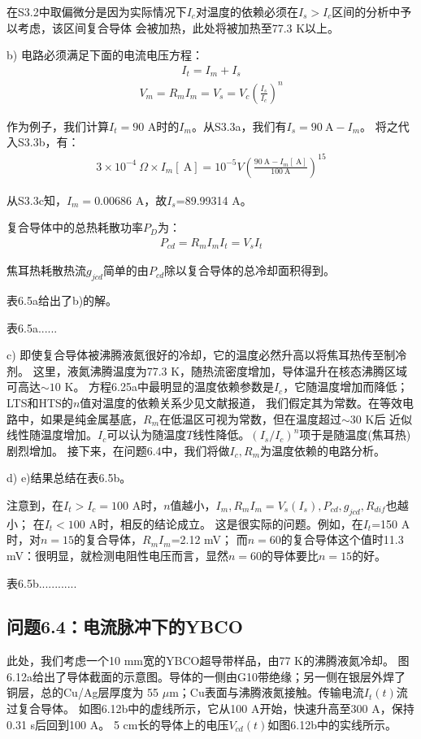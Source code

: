 在S3.2中取偏微分是因为实际情况下$I_c$对温度的依赖必须在$I_s>I_c$区间的分析中予以考虑，该区间复合导体
会被加热，此处将被加热至77.3 K以上。

b) 电路必须满足下面的电流电压方程：
\begin{align*}%
I_t=I_m+I_s \tag{S3.3a}
\end{align*}
\begin{align*}%
V_m=R_mI_m=V_s=V_c(\frac{I_s}{I_c})^{n} \tag{S3.3b}
\end{align*}

作为例子，我们计算$I_t=90$ A时的$I_m$。从S3.3a，我们有$I_s=90\ \mathrm{A}-I_m$。
将之代入S3.3b，有：
\begin{align*}%
3\times 10^{-4}\ \Omega\times I_m[\ \mathrm{A}]=10^{-5}V(\frac{90\ \mathrm{A}-I_m[\ \mathrm{A}]}{100\ \mathrm{A}})^{15} \tag{S3.3c}
\end{align*}

从S3.3c知，$I_m=$0.00686 A，故$I_s$=89.99314 A。

复合导体中的总热耗散功率$P_D$为：
\begin{align*}%
P_{cd}=R_mI_mI_t=V_sI_t \tag{S3.4}
\end{align*}

焦耳热耗散热流$g_{jcd}$简单的由$P_{cd}$除以复合导体的总冷却面积得到。

表6.5a给出了b)的解。

表6.5a......

c) 即使复合导体被沸腾液氮很好的冷却，它的温度必然升高以将焦耳热传至制冷剂。
这里，液氮沸腾温度为77.3 K，随热流密度增加，导体温升在核态沸腾区域可高达$\sim 10$ K。
方程6.25a中最明显的温度依赖参数是$I_c$，它随温度增加而降低；LTS和HTS的$n$值对温度的依赖关系少见文献报道，
我们假定其为常数。在等效电路中，如果是纯金属基底，$R_m$在低温区可视为常数，但在温度超过$\sim 30$ K后
近似线性随温度增加。$I_c$可以认为随温度$T$线性降低。$(I_s/I_c)^n$项于是随温度(焦耳热)剧烈增加。
接下来，在问题6.4中，我们将做$I_c,R_m$为温度依赖的电路分析。

d) e)结果总结在表6.5b。

注意到，在$I_t>I_c=100$ A时，$n$值越小，$I_m, R_m I_m=V_s(I_s),P_{cd},g_{jcd},R_{dif}$也越小；
在$I_t<100$ A时，相反的结论成立。
这是很实际的问题。例如，在$I_t$=150 A时，对$n=15$的复合导体，$R_mI_m$=2.12 mV；
而$n=60$的复合导体这个值时11.3 mV：很明显，就检测电阻性电压而言，显然$n=60$的导体要比$n=15$的好。 

表6.5b............


\subsection{问题6.4：电流脉冲下的YBCO}
此处，我们考虑一个10 mm宽的YBCO超导带样品，由77 K的沸腾液氮冷却。
图6.12a给出了导体截面的示意图。导体的一侧由G10带绝缘；另一侧在银层外焊了铜层，总的Cu/Ag层厚度为
55 $\mu$m；Cu表面与沸腾液氮接触。传输电流$I_t(t)$流过复合导体。
如图6.12b中的虚线所示，它从100 A开始，快速升高至300 A，保持0.31 s后回到100 A。
5 cm长的导体上的电压$V_{cd}(t)$如图6.12b中的实线所示。

